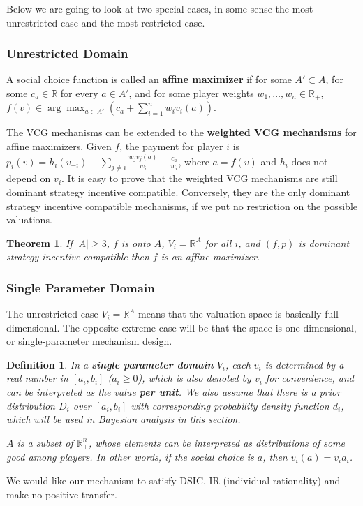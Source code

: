 \documentclass[openany]{book}
\newtheorem{definition}{Definition}[chapter]
\newtheorem{theorem}{Theorem}[chapter]
\theoremstyle{remark}
\begin{document}
Below we are going to look at two special cases, in some sense the most unrestricted case and the most restricted case.

\subsubsection{Unrestricted Domain}
A social choice function is called an \textbf{affine maximizer} if for some $A'\subset A$, for some $c_a\in \mathbb{R}$ for every $a\in A'$, and for some player weights $w_1,\ldots,w_n\in \mathbb{R}_+$, $f(v)\in\arg\max_{a\in A'}(c_a+\sum_{i=1}^{n}w_iv_i(a))$.

The VCG mechanisms can be extended to the \textbf{weighted VCG mechanisms} for affine maximizers. Given $f$, the payment for player $i$ is $p_i(v)=h_i(v_{-i})-\sum_{j\ne i}^{}\frac{w_jv_j(a)}{w_i}-\frac{c_a}{w_i}$, where $a=f(v)$ and $h_i$ does not depend on $v_i$. It is easy to prove that the weighted VCG mechanisms are still dominant strategy incentive compatible. Conversely, they are the only dominant strategy incentive compatible mechanisms, if we put no restriction on the possible valuations.
\begin{theorem}
    If $|A|\ge3$, $f$ is onto $A$, $V_i=\mathbb{R}^A$ for all $i$, and $(f,p)$ is dominant strategy incentive compatible then $f$ is an affine maximizer.
\end{theorem}

\subsubsection{Single Parameter Domain}
The unrestricted case $V_i=\mathbb{R}^A$ means that the valuation space is basically full-dimensional. The opposite extreme case will be that the space is one-dimensional, or single-parameter mechanism design.
\begin{definition}
    In a \textbf{single parameter domain} $V_i$, each $v_i$ is determined by a real number in $[a_i,b_i]$ ($a_i\ge0$), which is also denoted by $v_i$ for convenience, and can be interpreted as the value \textbf{per unit}. We also assume that there is a prior distribution $D_i$ over $[a_i,b_i]$ with corresponding probability density function $d_i$, which will be used in Bayesian analysis in this section.

    $A$ is a subset of $\mathbb{R}_+^n$, whose elements can be interpreted as distributions of some good among players. In other words, if the social choice is $a$, then $v_i(a)=v_ia_i$.
\end{definition}
We would like our mechanism to satisfy DSIC, IR (individual rationality) and make no positive transfer.
\end{document}
